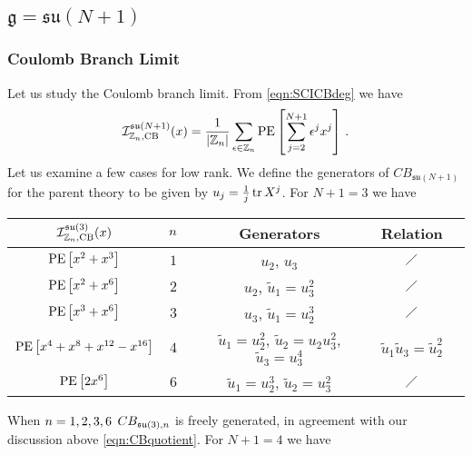 \documentclass[main.tex]{subfiles}
\begin{document}
\subsection{\texorpdfstring{$\mathfrak{g}=\mathfrak{su}(N+1)$}{g=su(N+1)}}
\subsubsection{Coulomb Branch Limit}
Let us study the Coulomb branch limit. From \eqref{eqn:SCICBdeg} we have
\begin{equation}\label{eqn:CBsuN}
\mathcal{I}_{\mathbb{Z}_{n},\text{CB}}^{\mathfrak{su}(N+1)}(x)=\frac{1}{|\mathbb{Z}_{n}|}\sum_{\epsilon\in\mathbb{Z}_{n}}\operatorname{\mathrm{PE}}\left[\sum_{j=2}^{N+1}\epsilon^jx^j\right]\,.
\end{equation}
Let us examine a few cases for low rank. We define the generators of $CB_{\mathfrak{su}(N+1)}$ for the parent theory to be given by $u_j=\frac{1}{j}\operatorname{tr} X^j$. For $N+1=3$ we have
\vspace{0.1cm}
\begin{center}
\begin{tabular}{|c|c|c|c|c|}
\hline
$\mathcal{I}_{\mathbb{Z}_{n},\text{CB}}^{\mathfrak{su}(3)}(x)$&${n}$&Generators&Relation\\\hline
$\operatorname{\mathrm{PE}}\left[x^2+x^3\right]$ & $1$&$u_2$, $u_3$&$\diagup$\\\hline
$\operatorname{\mathrm{PE}}\left[x^2+x^6\right]$ & $2$ & $u_2$, $\widetilde{u}_1=u_3^2$&$\diagup$\\\hline
$\operatorname{\mathrm{PE}}\left[x^3+x^6\right]$ & $3$& $u_3$, $\widetilde{u}_1=u_2^3$&$\diagup$\\\hline
$\operatorname{\mathrm{PE}}\left[x^4+x^8+x^{12}-x^{16}\right]$ & $4$ & $\widetilde{u}_1=u_2^2$, $\widetilde{u}_2=u_2u_3^2$, $\widetilde{u}_3=u_3^4$&$\widetilde{u}_1\widetilde{u}_3=\widetilde{u}_2^2$\\\hline
$\operatorname{\mathrm{PE}}\left[2x^6\right]$ & $6$&$\widetilde{u}_1=u_2^3$, $\widetilde{u}_2=u_3^2$&$\diagup$\\\hline
\end{tabular}
\end{center}
\vspace{0.1cm}
When $n=1,2,3,6$ $CB_{\mathfrak{su}(3),n}$ is freely generated, in agreement with our discussion above \eqref{eqn:CBquotient}. For $N+1=4$ we have
\vspace{0.1cm}
\end{document}
